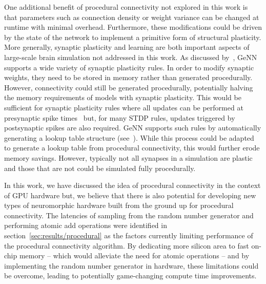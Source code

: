 \documentclass[9pt,a4paper]{amsart}
\begin{document}
One additional benefit of procedural connectivity not explored in this work is that parameters such as connection density or weight variance can be changed at runtime with minimal overhead.
Furthermore, these modifications could be driven by the state of the network to implement a primitive form of structural plasticity.
More generally, synaptic plasticity and learning are both important aspects of large-scale brain simulation not addressed in this work.
As discussed by~\citet{Knight2018}, GeNN supports a wide variety of synaptic plasticity rules.
In order to modify synaptic weights, they need to be stored in memory rather than generated procedurally.
However, connectivity could still be generated procedurally, potentially halving the memory requirements of models with synaptic plasticity.
This would be sufficient for synaptic plasticity rules where all updates can be performed at presynaptic spike times~\citep{Brader2007,Clopath2010c} but, for many STDP rules, updates triggered by postsynaptic spikes are also required.
GeNN supports such rules by automatically generating a lookup table structure (see~\citet{Knight2018}).
While this process could be adapted to generate a lookup table from procedural connectivity, this would further erode memory savings.
However, typically not all synapses in a simulation are plastic and those that are not could be simulated fully procedurally.

In this work, we have discussed the idea of procedural connectivity in the context of GPU hardware but, we believe that there is also potential for developing new types of neuromorphic hardware built from the ground up for procedural connectivity.
The latencies of sampling from the random number generator and performing atomic add operations were identified in section~\ref{sec:results/procedural} as the factors currently limiting performance of the procedural connectivity algorithm.
By dedicating more silicon area to fast on-chip memory -- which would alleviate the need for atomic operations -- and by implementing the random number generator in hardware, these limitations could be overcome, leading to potentially game-changing compute time improvements.
%
\end{document}
